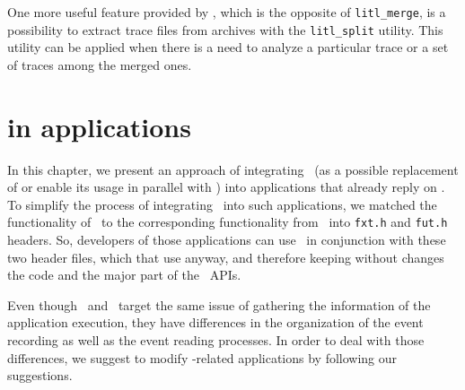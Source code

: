 One more useful feature provided by \litl{}, which is the opposite of 
\texttt{litl\_merge}, is a possibility to extract trace files from archives 
with the \texttt{litl\_split} utility. This utility can be applied when there is 
a need to analyze a particular trace or a set of traces among the merged ones.

\begin{landscape}

\end{landscape}  


\chapter{\litl{} in \fxt{} applications}
In this chapter, we present an approach of integrating \litl\ (as a possible 
replacement of or enable its usage in parallel with \fxt) into applications 
that already reply on \fxt{}. To simplify the process of integrating \litl\ 
into such applications, we matched the functionality of \fxt\ to the 
corresponding functionality from \litl\ into \texttt{fxt.h} and \texttt{fut.h} 
headers. So, developers of those applications can use \litl\ in conjunction with 
these two header files, which that use anyway, and therefore keeping without 
changes the code and the major part of the \fxt\ APIs.

Even though \litl\ and \fxt\ target the same issue of gathering the 
information of the application execution, they have differences in the 
organization of the event recording as well as the event reading processes. In 
order to deal with those differences, we suggest to modify \fxt-related 
applications by following our suggestions.

